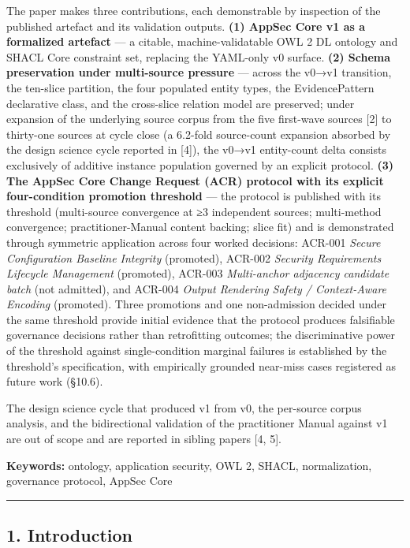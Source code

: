 \documentclass[
]{article}
\begin{document}
The paper makes three contributions, each demonstrable by inspection of
the published artefact and its validation outputs. \textbf{(1) AppSec
Core v1 as a formalized artefact} --- a citable, machine-validatable OWL
2 DL ontology and SHACL Core constraint set, replacing the YAML-only v0
surface. \textbf{(2) Schema preservation under multi-source pressure}
--- across the v0→v1 transition, the ten-slice partition, the four
populated entity types, the EvidencePattern declarative class, and the
cross-slice relation model are preserved; under expansion of the
underlying source corpus from the five first-wave sources {[}2{]} to
thirty-one sources at cycle close (a 6.2-fold source-count expansion
absorbed by the design science cycle reported in {[}4{]}), the v0→v1
entity-count delta consists exclusively of additive instance population
governed by an explicit protocol. \textbf{(3) The AppSec Core Change
Request (ACR) protocol with its explicit four-condition promotion
threshold} --- the protocol is published with its threshold
(multi-source convergence at ≥3 independent sources; multi-method
convergence; practitioner-Manual content backing; slice fit) and is
demonstrated through symmetric application across four worked decisions:
ACR-001 \emph{Secure Configuration Baseline Integrity} (promoted),
ACR-002 \emph{Security Requirements Lifecycle Management} (promoted),
ACR-003 \emph{Multi-anchor adjacency candidate batch} (not admitted),
and ACR-004 \emph{Output Rendering Safety / Context-Aware Encoding}
(promoted). Three promotions and one non-admission decided under the
same threshold provide initial evidence that the protocol produces
falsifiable governance decisions rather than retrofitting outcomes; the
discriminative power of the threshold against single-condition marginal
failures is established by the threshold's specification, with
empirically grounded near-miss cases registered as future work (§10.6).

The design science cycle that produced v1 from v0, the per-source corpus
analysis, and the bidirectional validation of the practitioner Manual
against v1 are out of scope and are reported in sibling papers {[}4,
5{]}.

\textbf{Keywords:} ontology, application security, OWL 2, SHACL,
normalization, governance protocol, AppSec Core

\begin{center}\rule{0.5\linewidth}{0.5pt}\end{center}

\subsection{1. Introduction}\label{introduction}
\end{document}
